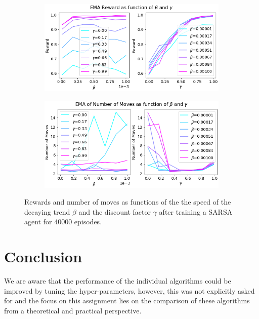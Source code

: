 \documentclass[conference]{IEEEtran}
\begin{document}
\begin{figure}
    \centering
    \begin{subfigure}[]{.5\textwidth}
        \includegraphics[width=\textwidth]{../figures/sarsa_Reward.png}
    \end{subfigure}
    \begin{subfigure}[]{.5\textwidth}
        \includegraphics[width=\textwidth]{../figures/sarsa_Number of Moves.png}
    \end{subfigure}
    \caption{Rewards and number of moves as functions of the the speed of the decaying trend $\beta$ and the discount factor $\gamma$ after training a SARSA agent for 40000 episodes.}
    \label{fig:hyper-parameters}
\end{figure}










\section{Conclusion}\label{sec:conclusion}

We are aware that the performance of the individual algorithms could be improved by tuning the hyper-parameters, however, this was not explicitly asked for and the focus on this assignment lies on the comparison of these algorithms from a theoretical and practical perspective.
\end{document}
